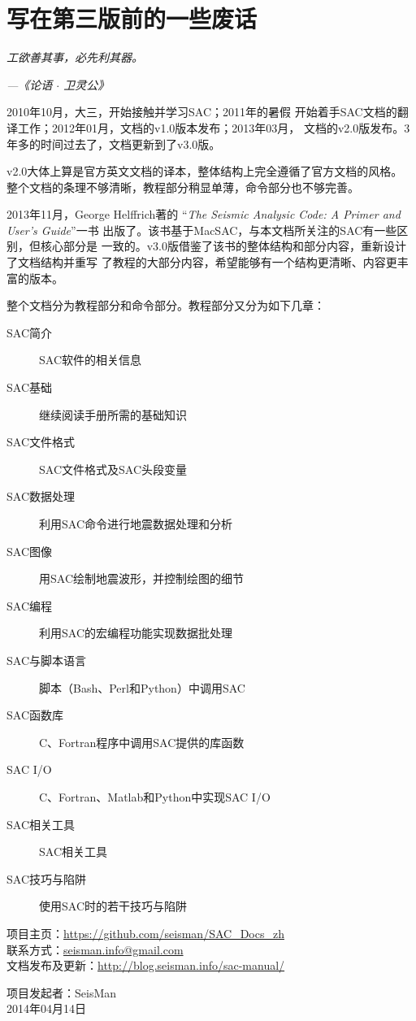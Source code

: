 {\section*{写在第三版前的一些废话}}

\begin{shadequote*}
\Large\emph{工欲善其事，必先利其器。}
\par\hfill\emph{\normalsize---《论语 $\cdot$ 卫灵公》}
\end{shadequote*}

2010年10月，大三，开始接触并学习SAC；2011年的暑假
开始着手SAC文档的翻译工作；2012年01月，文档的v1.0版本发布；2013年03月，
文档的v2.0版发布。3年多的时间过去了，文档更新到了v3.0版。

v2.0大体上算是官方英文文档的译本，整体结构上完全遵循了官方文档的风格。
整个文档的条理不够清晰，教程部分稍显单薄，命令部分也不够完善。

2013年11月，George Helffrich著的
``\emph{The Seismic Analysic Code: A Primer and User's Guide}''一书
出版了。该书基于MacSAC，与本文档所关注的SAC有一些区别，但核心部分是
一致的。v3.0版借鉴了该书的整体结构和部分内容，重新设计了文档结构并重写
了教程的大部分内容，希望能够有一个结构更清晰、内容更丰富的版本。

整个文档分为教程部分和命令部分。教程部分又分为如下几章：
\begin{description}
\item[SAC简介] SAC软件的相关信息
\item[SAC基础] 继续阅读手册所需的基础知识
\item[SAC文件格式] SAC文件格式及SAC头段变量
\item[SAC数据处理] 利用SAC命令进行地震数据处理和分析
\item[SAC图像] 用SAC绘制地震波形，并控制绘图的细节
\item[SAC编程] 利用SAC的宏编程功能实现数据批处理
\item[SAC与脚本语言] 脚本（Bash、Perl和Python）中调用SAC
\item[SAC函数库] C、Fortran程序中调用SAC提供的库函数
\item[SAC I/O] C、Fortran、Matlab和Python中实现SAC I/O
\item[SAC相关工具] SAC相关工具
\item[SAC技巧与陷阱] 使用SAC时的若干技巧与陷阱
\end{description}

\begin{flushleft}
项目主页：\url{https://github.com/seisman/SAC_Docs_zh}      \\
联系方式：\url{seisman.info@gmail.com}                      \\
文档发布及更新：\url{http://blog.seisman.info/sac-manual/}   \\
\end{flushleft}

\begin{flushright}
项目发起者：SeisMan \\
2014年04月14日
\end{flushright}
